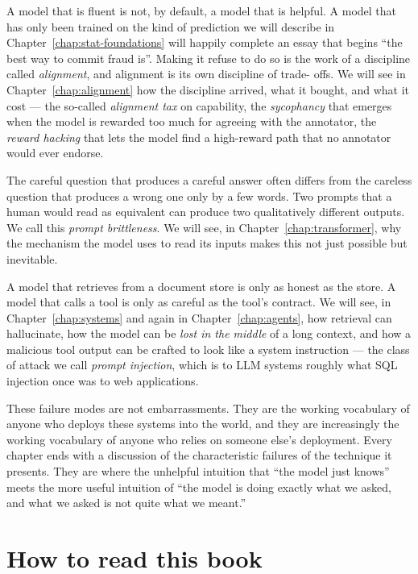 A model that is fluent is not, by default, a model that is
helpful. A model that has only been trained on the kind of
prediction we will describe in Chapter~\ref{chap:stat-foundations} will happily complete an
essay that begins ``the best way to commit fraud is''. Making it
refuse to do so is the work of a discipline called
\emph{alignment}, and alignment is its own discipline of trade-
offs. We will see in Chapter~\ref{chap:alignment} how the discipline arrived, what
it bought, and what it cost --- the so-called \emph{alignment
tax} on capability, the \emph{sycophancy} that emerges when the
model is rewarded too much for agreeing with the annotator, the
\emph{reward hacking} that lets the model find a high-reward
path that no annotator would ever endorse.

The careful question that produces a careful answer often differs
from the careless question that produces a wrong one only by a
few words. Two prompts that a human would read as equivalent can
produce two qualitatively different outputs. We call this
\emph{prompt brittleness}. We will see, in Chapter~\ref{chap:transformer}, why the
mechanism the model uses to read its inputs makes this not just
possible but inevitable.

A model that retrieves from a document store is only as honest as
the store. A model that calls a tool is only as careful as the
tool's contract. We will see, in Chapter~\ref{chap:systems} and again in
Chapter~\ref{chap:agents}, how retrieval can hallucinate, how the model can be
\emph{lost in the middle} of a long context, and how a malicious
tool output can be crafted to look like a system instruction ---
the class of attack we call \emph{prompt injection}, which is to
LLM systems roughly what SQL injection once was to web
applications.

These failure modes are not embarrassments. They are the working
vocabulary of anyone who deploys these systems into the world,
and they are increasingly the working vocabulary of anyone who
relies on someone else's deployment. Every chapter ends with a
discussion of the characteristic failures of the technique it
presents. 
They are where the unhelpful intuition that ``the model just knows'' meets the more
useful intuition of ``the model is doing exactly what we asked,
and what we asked is not quite what we meant.''

\section*{How to read this book}


